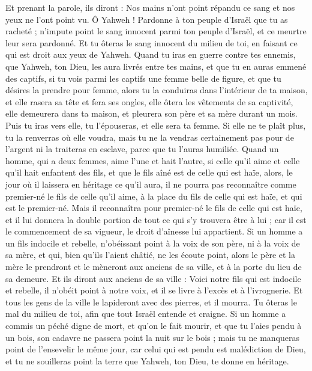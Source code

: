 \begin{multicols}{2}
Et prenant la parole, ils diront : Nos mains n'ont point répandu ce sang et nos yeux ne l'ont point vu.
Ô Yahweh ! Pardonne à ton peuple d'Israël que tu as racheté ; n’impute point le sang innocent parmi ton peuple d'Israël, et ce meurtre leur sera pardonné.
Et tu ôteras le sang innocent du milieu de toi, en faisant ce qui est droit aux yeux de Yahweh.
Quand tu iras en guerre contre tes ennemis, que Yahweh, ton Dieu, les aura livrés entre tes mains, et que tu en auras emmené des captifs,
si tu vois parmi les captifs une femme belle de figure, et que tu désires la prendre pour femme,
alors tu la conduiras dans l’intérieur de ta maison, et elle rasera sa tête et fera ses ongles,
elle ôtera les vêtements de sa captivité, elle demeurera dans ta maison, et pleurera son père et sa mère durant un mois. Puis tu iras vers elle, tu l’épouseras, et elle sera ta femme.
Si elle ne te plaît plus, tu la renverras où elle voudra, mais tu ne la vendras certainement pas pour de l'argent ni la traiteras en esclave, parce que tu l'auras humiliée.
Quand un homme, qui a deux femmes, aime l'une et hait l’autre, si celle qu’il aime et celle qu’il hait enfantent des fils, et que le fils aîné est de celle qui est haïe,
alors, le jour où il laissera en héritage ce qu’il aura, il ne pourra pas reconnaître comme premier-né le fils de celle qu’il aime, à la place du fils de celle qui est haïe, et qui est le premier-né.
Mais il reconnaîtra pour premier-né le fils de celle qui est haïe, et il lui donnera la double portion de tout ce qui s’y trouvera être à lui ; car il est le commencement de sa vigueur, le droit d'aînesse lui appartient.
Si un homme a un fils indocile et rebelle, n'obéissant point à la voix de son père, ni à la voix de sa mère, et qui, bien qu'ils l'aient châtié, ne les écoute point,
alors le père et la mère le prendront et le mèneront aux anciens de sa ville, et à la porte du lieu de sa demeure.
Et ils diront aux anciens de sa ville : Voici notre fils qui est indocile et rebelle, il n'obéit point à notre voix, et il se livre à l’excès et à l’ivrognerie.
Et tous les gens de la ville le lapideront avec des pierres, et il mourra. Tu ôteras le mal du milieu de toi, afin que tout Israël entende et craigne.
Si un homme a commis un péché digne de mort, et qu'on le fait mourir, et que tu l’aies pendu à un bois,
son cadavre ne passera point la nuit sur le bois ; mais tu ne manqueras point de l'ensevelir le même jour, car celui qui est pendu est malédiction de Dieu\FTNT{}, et tu ne souilleras point la terre que Yahweh, ton Dieu, te donne en héritage.

\end{multicols}
